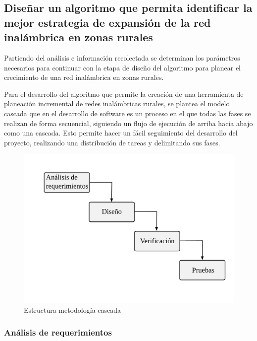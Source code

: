 \documentclass[]{article}
\begin{document}
\subsection{Diseñar un algoritmo que permita identificar la mejor
estrategia de expansión de la red inalámbrica en zonas
rurales}\label{diseuxf1ar-un-algoritmo-que-permita-identificar-la-mejor-estrategia-de-expansiuxf3n-de-la-red-inaluxe1mbrica-en-zonas-rurales}

Partiendo del análisis e información recolectada se determinan los
parámetros necesarios para continuar con la etapa de diseño del
algoritmo para planear el crecimiento de una red inalámbrica en zonas
rurales.

Para el desarrollo del algoritmo que permite la creación de una
herramienta de planeación incremental de redes inalámbricas rurales, se
plantea el modelo cascada que en el desarrollo de software es un proceso
en el que todas las fases se realizan de forma secuencial, siguiendo un
flujo de ejecución de arriba hacia abajo como una cascada. Esto permite
hacer un fácil seguimiento del desarrollo del proyecto, realizando una
distribución de tareas y delimitando sus fases.

\begin{figure}
\centering
\includegraphics{metodologia.pdf}
\caption{Estructura metodología cascada}
\end{figure}

\subsubsection{Análisis de
requerimientos}\label{anuxe1lisis-de-requerimientos}
\end{document}
